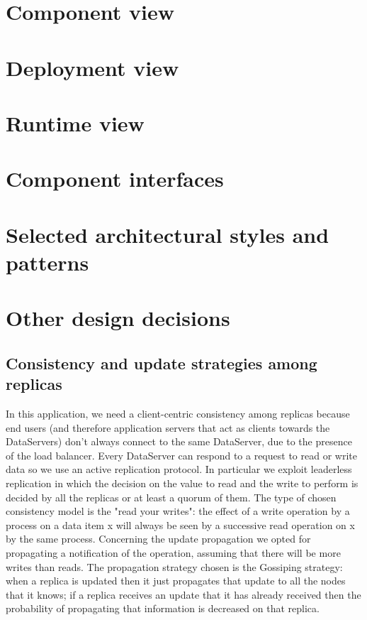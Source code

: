 \documentclass[a4paper]{report}
\begin{document}
\section{Component view}

\section{Deployment view}
\section{Runtime view}
\section{Component interfaces}
\section{Selected architectural	styles and patterns}
\section{Other design decisions}
\subsection{Consistency and update strategies among replicas}
In this application,  we need a client-centric consistency among replicas because end users (and therefore application servers that act as clients towards the DataServers) don't always connect to the same DataServer, due to the presence of the load balancer. Every DataServer can respond to a request to read or write data so we use an active replication protocol. In particular we exploit leaderless replication in which the decision on the value to read and the write to perform is decided by all the replicas or at least a quorum of them. The type of chosen consistency model  is the "read your writes": the effect of a write operation by a process on a data item x will always be seen by a successive read operation on x by the same process. 
Concerning the update propagation we opted for propagating a notification of the operation, assuming that there will be more writes than reads.  The propagation strategy chosen is the Gossiping strategy: when a replica is updated then it just propagates that update to all the nodes that it knows; if a replica receives an update that it has already received then the probability of propagating that information is decreased on that replica. 
\end{document}
